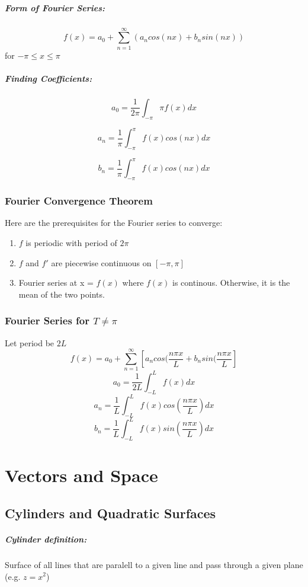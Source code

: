 \documentclass[a4paper,12pt]{report}
\begin{document}
\paragraph{Form of Fourier Series: }
$$f(x) = a_0 + \sum_{n=1}^{\infty} (a_n cos(nx) + b_n sin(nx))$$
for $-\pi \leq x \leq \pi$

\paragraph{Finding Coefficients: }
$$a_0 = \frac{1}{2\pi} \int_{-\pi}{\pi} f(x) dx$$

$$a_n = \frac{1}{\pi} \int_{-\pi}^{\pi} f(x) cos(nx) dx$$

$$b_n = \frac{1}{\pi} \int_{-\pi}^{\pi} f(x) cos(nx) dx$$

\subsection{Fourier Convergence Theorem}
Here are the prerequisites for the Fourier series to converge:
\begin{enumerate}
\item $f$ is periodic with period of $2\pi$
\item $f$ and $f'$ are piecewise continuous on $[-\pi, \pi]$
\item Fourier series at x = $f(x)$ where $f(x)$ is continous. Otherwise, it is the mean of the two points.
\end{enumerate}

\subsection{Fourier Series for $T \neq \pi$}
Let period be $2L$
$$f(x) = a_0 + \sum_{n=1}^{\infty} [a_n cos(\frac{n\pi x}{L} + b_n sin(\frac{n\pi x}{L}]$$
$$a_0 = \frac{1}{2L} \int_{-L}^{L} f(x) dx$$
$$a_n = \frac{1}{L}\int_{-L}^{L} f(x) cos(\frac{n\pi x}{L}) dx$$
$$b_n = \frac{1}{L}\int_{-L}^{L} f(x) sin(\frac{n\pi x}{L}) dx$$

\chapter{Vectors and Space}
\section{Cylinders and Quadratic Surfaces}
\paragraph{Cylinder definition: } Surface of all lines that are paralell to a given line and pass through a given plane (e.g. $z = x^2$)
\end{document}
